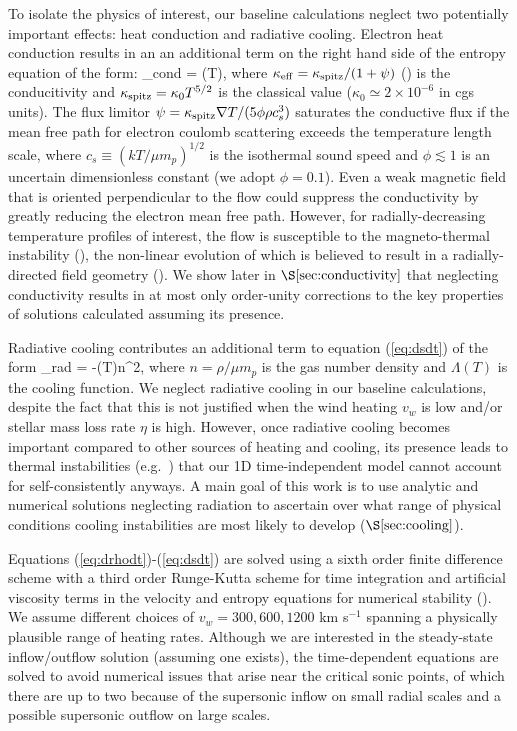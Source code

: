 \documentclass[usenatbib,fleqn]{mn2e}
\newcommand{\vwO}{v_{w}}
\begin{document}
To isolate the physics of interest, our baseline calculations neglect two potentially important effects: heat conduction and radiative cooling.  Electron heat conduction results in an an additional term on the right hand side of the entropy equation of the form:  
\be {}_{\rm cond} = \nabla\cdot(\kappa \nabla T), \ee
where $\kappa_{\rm
  eff}=\kappa_{\rm spitz}/(1+\psi)$ (\citealt{DaltonBalbus:1993a}) is
the conducitivity and $\kappa_{\rm spitz} = \kappa_0 T^{5/2}$ is the
classical \citet{Spitzer62} value ($\kappa_0\simeq 2\times 10^{-6}$ in
cgs units).  The flux limitor $\psi = \kappa_{\rm spitz} \nabla
T/(5\phi \rho c_s^3)$ saturates the conductive flux if the mean free
path for electron coulomb scattering exceeds the
temperature length scale, where $c_s \equiv (kT/\mu m_p)^{1/2}$ is the
isothermal sound speed and $\phi \lesssim 1$ is an uncertain
dimensionless constant (we adopt $\phi = 0.1$).  Even a weak magnetic
field that is oriented perpendicular to the flow could suppress the
conductivity by greatly reducing the electron mean free path.  However, for radially-decreasing temperature profiles
of interest, the flow is susceptible to the magneto-thermal instability (\citealt{Balbus01}), the non-linear evolution of which is believed to result in a radially-directed field geometry (\citealt{Parrish&Stone07}).  We show later in $\S\ref{sec:conductivity}$ that neglecting conductivity results in at most only order-unity corrections to the key properties of solutions calculated assuming its presence.

Radiative cooling contributes an additional term to equation (\ref{eq:dsdt}) of the form
\be
{}_{\rm rad} = -\Lambda(T)n^{2},
\label{eq:qdot_rad}
\ee
where $n = \rho/\mu m_p$ is the gas number density and $\Lambda(T)$ is the cooling function.  We neglect radiative cooling in our baseline calculations, despite the fact that this is not justified when the wind heating $\vwO$ is low and/or stellar mass loss rate $\eta$ is high.  However, once radiative cooling becomes important compared to other sources of heating and cooling, its presence leads to thermal instabilities (e.g.~\citealt{McCourt+12}) that our 1D
time-independent model cannot account for self-consistently anyways.  A main goal of this work is to use analytic and numerical solutions neglecting radiation to ascertain over what range of physical conditions cooling instabilities are most likely to develop ($\S\ref{sec:cooling}$).

Equations (\ref{eq:drhodt})-(\ref{eq:dsdt}) are solved using a sixth
order finite difference scheme with a third order Runge-Kutta scheme
for time integration and artificial viscosity terms in the velocity
and entropy equations for numerical stability
(\citealt{Brandenburg:2003a}).  We assume different
choices of $v_{w} = 300, 600, 1200$ km s$^{-1}$ spanning a
physically plausible range of heating rates.  Although we are interested in the
steady-state inflow/outflow solution (assuming one exists), the time-dependent equations are solved to avoid numerical issues that arise near the critical sonic points, of which there are up to two because of the supersonic
inflow on small radial scales and a possible supersonic outflow on large scales.
\end{document}
